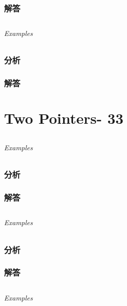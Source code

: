 \documentclass[UTF8,a4paper,12pt]{ctexbook}
\begin{document}
	\subsection{解答}
	
\section{}
	
	\subparagraph{Examples}
	
	\subsection{分析}
	
	\subsection{解答}
\chapter{Two Pointers- 33}
\section{}
	
	\subparagraph{Examples}
	
	\subsection{分析}
	
	\subsection{解答}
	
\section{}
	
	\subparagraph{Examples}
	
	\subsection{分析}
	
	\subsection{解答}

\section{}	
	\subparagraph{Examples}
	
\end{document}
